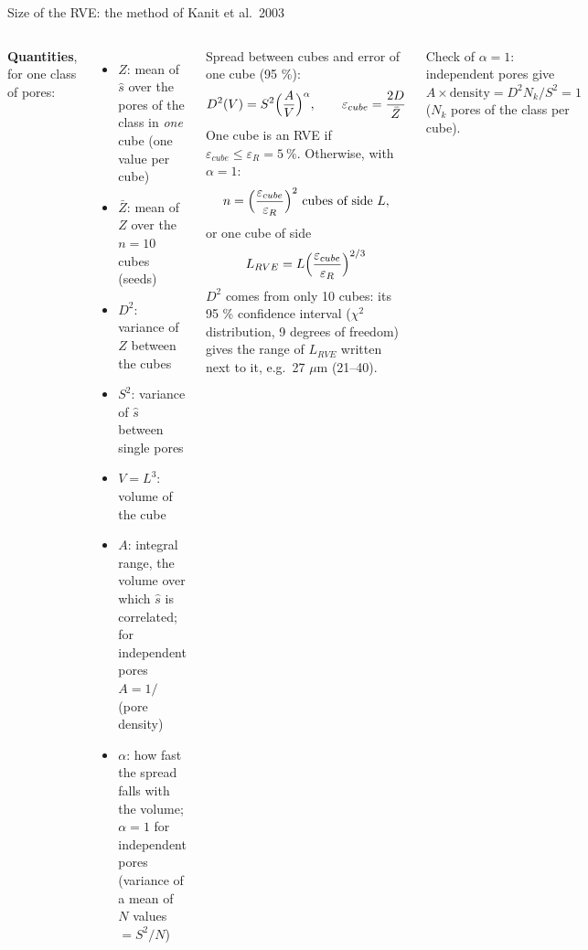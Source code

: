 \documentclass[10pt,aspectratio=169]{beamer}
\begin{document}
\begin{frame}{Size of the RVE: the method of Kanit et al.\ 2003}
\begin{columns}[T]
\small
\textbf{Quantities}, for one class of pores:
\begin{itemize}
\item $Z$: mean of $\hat s$ over the pores of the class in \emph{one} cube (one value per cube)
\item $\bar Z$: mean of $Z$ over the $n=10$ cubes (seeds)
\item $D^2$: variance of $Z$ between the cubes
\item $S^2$: variance of $\hat s$ between single pores
\item $V=L^3$: volume of the cube
\item $A$: integral range, the volume over which $\hat s$ is correlated; for independent pores $A=1/$(pore density)
\item $\alpha$: how fast the spread falls with the volume; $\alpha=1$ for independent pores (variance of a mean of $N$
      values $=S^2/N$)
\end{itemize}
\footnotesize
Spread between cubes and error of one cube (95 \%):
\[
D^2(V)=S^2\Bigl(\frac{A}{V}\Bigr)^{\alpha},\qquad
\varepsilon_{cube}=\frac{2D}{\bar Z}
\]
One cube is an RVE if $\varepsilon_{cube}\le\varepsilon_R=5\ \%$. Otherwise, with $\alpha=1$:
\[
n=\Bigl(\frac{\varepsilon_{cube}}{\varepsilon_R}\Bigr)^{2}\ \text{cubes of side }L,
\]
or one cube of side
\[
L_{RVE}=L\Bigl(\frac{\varepsilon_{cube}}{\varepsilon_R}\Bigr)^{2/3}
\]
$D^2$ comes from only 10 cubes: its 95 \% confidence interval ($\chi^2$ distribution, 9 degrees of freedom) gives the
range of $L_{RVE}$ written next to it, e.g.\ 27 $\mu$m (21--40).
\vspace{4pt}

Check of $\alpha=1$: independent pores give $A\times\text{density}=D^2N_k/S^2=1$ ($N_k$ pores of the class per cube).
\end{columns}
\end{frame}
\end{document}
